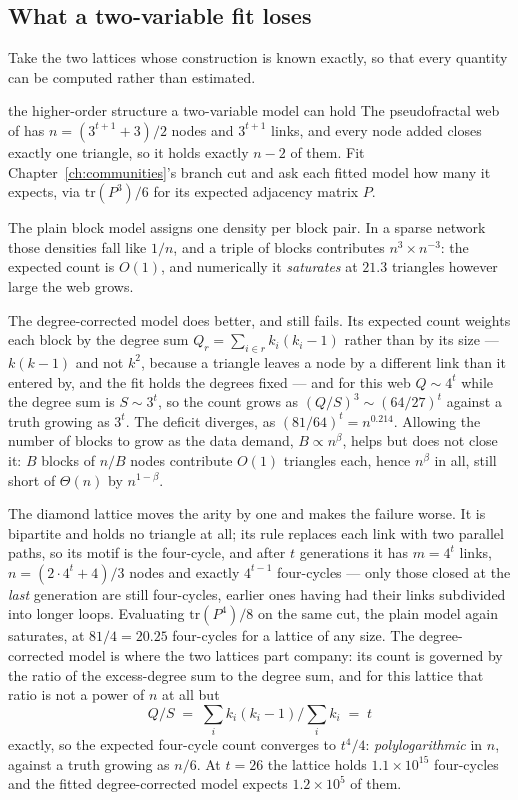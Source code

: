 \subsection*{What a two-variable fit loses}

Take the two lattices whose construction is known exactly, so that every quantity
can be computed rather than estimated.

\begin{calculation}{the higher-order structure a two-variable model can hold}
The pseudofractal web of \citet{dorogovtsevgoltsev2002} has $n=(3^{t+1}+3)/2$
nodes and $3^{t+1}$ links, and every node added closes exactly one triangle, so
it holds exactly $n-2$ of them. Fit Chapter~\ref{ch:communities}'s branch cut and
ask each fitted model how many it expects, via $\mathrm{tr}(P^3)/6$ for its
expected adjacency matrix $P$.

The plain block model assigns one density per block pair. In a sparse network
those densities fall like $1/n$, and a triple of blocks contributes
$n^3\times n^{-3}$: the expected count is $O(1)$, and numerically it
\emph{saturates} at $21.3$ triangles however large the web grows.

The degree-corrected model does better, and still fails. Its expected count
weights each block by the degree sum $Q_r=\sum_{i\in r}k_i(k_i-1)$ rather than by
its size --- $k(k-1)$ and not $k^2$, because a triangle leaves a node by a
different link than it entered by, and the fit holds the degrees fixed --- and
for this web $Q\sim4^{t}$ while the degree sum is $S\sim3^{t}$, so the count
grows as $(Q/S)^3\sim(64/27)^t$ against a truth growing as $3^t$. The deficit
diverges, as $(81/64)^{t}=n^{0.214}$. Allowing the number of blocks to grow as
the data demand, $B\propto n^{\beta}$, helps but does not close it: $B$ blocks of
$n/B$ nodes contribute $O(1)$ triangles each, hence $n^{\beta}$ in all, still
short of $\Theta(n)$ by $n^{1-\beta}$.

The diamond lattice moves the arity by one and makes the failure worse. It is
bipartite and holds no triangle at all; its rule replaces each link with two
parallel paths, so its motif is the four-cycle, and after $t$ generations it has
$m=4^t$ links, $n=(2\cdot4^t+4)/3$ nodes and exactly $4^{t-1}$ four-cycles ---
only those closed at the \emph{last} generation are still four-cycles, earlier
ones having had their links subdivided into longer loops. Evaluating
$\mathrm{tr}(P^4)/8$ on the same cut, the plain model again saturates, at
$81/4=20.25$ four-cycles for a lattice of any size. The degree-corrected model is
where the two lattices part company: its count is governed by the ratio of the
excess-degree sum to the degree sum, and for this lattice that ratio is not a
power of $n$ at all but
\begin{equation}
  Q/S \;=\; \sum_i k_i(k_i-1) \Big/ \sum_i k_i \;=\; t
  \label{eq:gr-QS}
\end{equation}
exactly, so the expected four-cycle count converges to $t^4/4$:
\emph{poly\-log\-arithmic} in $n$, against a truth growing as $n/6$. At $t=26$ the
lattice holds $1.1\times10^{15}$ four-cycles and the fitted degree-corrected
model expects $1.2\times10^{5}$ of them.
\end{calculation}

